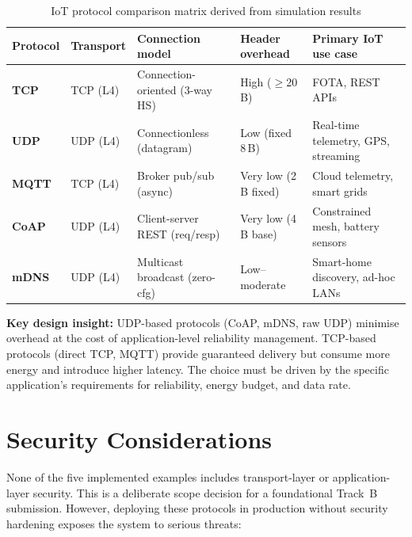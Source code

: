 \documentclass[12pt,a4paper]{article}
\begin{document}
\begin{table}[H]
\centering
\caption{IoT protocol comparison matrix derived from simulation results}
\label{tab:proto}
\renewcommand{\arraystretch}{1.35}
\begin{tabular}{>{\bfseries}p{1.6cm} p{1.4cm} p{2.1cm} p{1.8cm} p{4.4cm}}
\toprule
Protocol & Transport & Connection model & Header overhead & Primary IoT use case \\
\midrule
TCP   & TCP (L4) & Connection-oriented (3-way HS) & High ($\geq$20\,B)    & FOTA, REST APIs \\
UDP   & UDP (L4) & Connectionless (datagram)       & Low (fixed 8\,B)      & Real-time telemetry, GPS, streaming \\
MQTT  & TCP (L4) & Broker pub/sub (async)          & Very low (2\,B fixed) & Cloud telemetry, smart grids \\
CoAP  & UDP (L4) & Client-server REST (req/resp)   & Very low (4\,B base)  & Constrained mesh, battery sensors \\
mDNS  & UDP (L4) & Multicast broadcast (zero-cfg)  & Low--moderate         & Smart-home discovery, ad-hoc LANs \\
\bottomrule
\end{tabular}
\end{table}

\textbf{Key design insight:} UDP-based protocols (CoAP, mDNS, raw UDP)
minimise overhead at the cost of application-level reliability management.
TCP-based protocols (direct TCP, MQTT) provide guaranteed delivery but consume
more energy and introduce higher latency. The choice must be driven by the
specific application's requirements for reliability, energy budget, and
data rate.

\section{Security Considerations}
\label{sec:security}

None of the five implemented examples includes transport-layer or
application-layer security. This is a deliberate scope decision for a
foundational Track~B submission. However, deploying these protocols in
production without security hardening exposes the system to serious threats:
\end{document}
